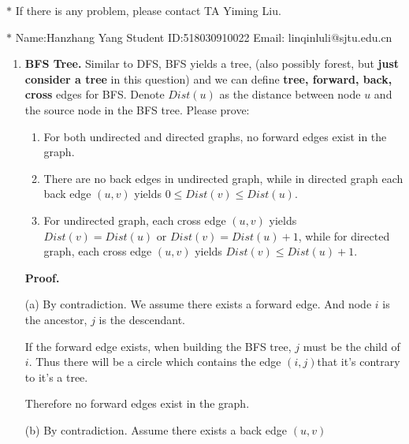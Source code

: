 \documentclass[12pt,a4paper]{article}
\theoremstyle{definition}
\begin{document}
\noindent

\noindent{}
\begin{center}
\footnotesize{\color{red}$*$ If there is any problem, please contact TA Yiming Liu.}

\footnotesize{\color{blue}$*$ Name:Hanzhang Yang  \quad Student ID:518030910022 \quad Email: linqinluli@sjtu.edu.cn}
\end{center}

\begin{enumerate}
    \item
    \textbf{BFS Tree.} Similar to DFS, BFS yields a tree, (also possibly forest, but \textbf{just consider a tree} in this question) and we can define \textbf{tree, forward, back, cross} edges for BFS. Denote $Dist(u)$ as the distance between node $u$ and the source node in the BFS tree. Please prove:
    \begin{enumerate}
    	\item For both undirected and directed graphs, no forward edges exist in the graph.
    	
    	\item There are no back edges in undirected graph, while in directed graph each back edge $(u,v)$ yields $0\leq Dist(v)\leq Dist(u)$.
    	
    	\item For undirected graph, each cross edge $(u,v)$ yields $Dist(v)=Dist(u)$ or $Dist(v)=Dist(u)+1$, while for directed graph, each cross edge $(u,v)$ yields $Dist(v)\leq Dist(u)+1$.
    	
    \end{enumerate}

	\textbf{Proof.}

	(a) By contradiction. We assume there exists a forward edge. And node $i$ is the ancestor, $j$ is the descendant.

	If the forward edge exists, when building the BFS tree, $j$ must be the child of $i$. Thus there will be a circle which contains the edge $(i,j)$that it's contrary to it's a tree.
	
	Therefore no forward edges exist in the graph.

	(b) By contradiction. Assume there exists a back edge $(u,v)$


\end{enumerate}
\end{document}
